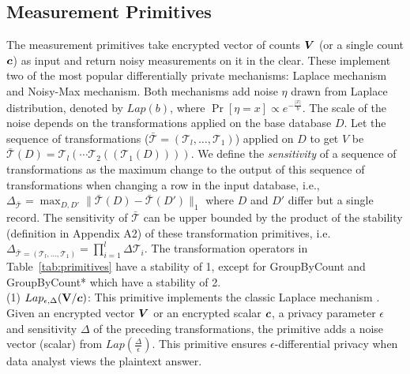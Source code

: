 \subsection{Measurement Primitives} \label{sec:measurement_primitives}
The measurement primitives take encrypted vector of counts $\boldsymbol{V}$ (or a single count $\boldsymbol{c}$) as input and return noisy measurements on it in the clear. These implement two of the most popular differentially private mechanisms: Laplace mechanism and Noisy-Max mechanism.
Both mechanisms add noise $\eta$ drawn from Laplace distribution, denoted by $Lap(b)$, where $\Pr[\eta =x]\propto e^{-{\frac{|x|}{b}}}$. The scale of the noise depends on the transformations applied on the base database $D$. Let the sequence of transformations ($\bar{\mathcal{T}}=(\mathcal{T}_l,\ldots,\mathcal{T}_1)$) applied on $D$ to get $V$ be $\bar{\mathcal{T}}(D) = \mathcal{T}_l(\cdots \mathcal{T}_2((\mathcal{T}_1(D))))$. We define the \emph{sensitivity} of a sequence of transformations as  the maximum change to the output of this sequence of transformations when changing a row in the input database, i.e.,
$\Delta_{\bar{\mathcal{T}}} = \max_{D,D'} \|\bar{\mathcal{T}}(D)-\bar{\mathcal{T}}(D')\|_1$ where $D$ and $D'$ differ but a single record.
The sensitivity of $\bar{\mathcal{T}}$ can be upper bounded by the product of the stability (definition in Appendix A2) of these transformation primitives, i.e. $\Delta_{\bar{\mathcal{T}}=(\mathcal{T}_l,\ldots,\mathcal{T}_1)} = \prod_{i=1}^l \Delta \mathcal{T}_i$. The transformation operators in Table~\ref{tab:primitives} have a stability of 1, except for \textsf{GroupByCount} and \textsf{GroupByCount*} which have a stability of 2. \\
(1) $Lap_{\epsilon,\Delta}(\mathbf{V}/\boldsymbol{c})$:  This primitive implements the classic Laplace mechanism \cite{Dork}.
Given an encrypted vector $\boldsymbol{V}$ or an encrypted scalar $\boldsymbol{c}$, a privacy parameter $\epsilon$ and sensitivity $\Delta$ of the preceding transformations, the primitive adds a noise vector (scalar) from $Lap(\frac{\Delta}{\epsilon})$. This primitive ensures $\epsilon$-differential privacy when data analyst views the plaintext answer.\\
